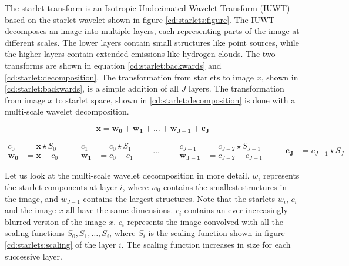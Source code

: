 The starlet transform is an Isotropic Undecimated Wavelet Transform (IUWT) based on the starlet wavelet shown in figure \ref{cd:starlets:figure}. The IUWT decomposes an image into multiple layers, each representing parts of the image at different scales. The lower layers contain small structures like point sources, while the higher layers contain extended emissions like hydrogen clouds. The two transforms are shown in equation \eqref{cd:starlet:backwards} and \eqref{cd:starlet:decomposition}. The transformation from starlets to image $x$, shown in \eqref{cd:starlet:backwards}, is a simple addition of all $J$ layers. The transformation from image $x$ to starlet space, shown in \eqref{cd:starlet:decomposition} is done with a multi-scale wavelet decomposition.

\begin{equation} \label{cd:starlet:backwards}
\bm{x} = \bm{w_0} + \bm{w_1} + \ldots + \bm{w_{J-1}} + \bm{c_J}
\end{equation}

\begin{equation}\label{cd:starlet:decomposition}
	\begin{split}
		c_0 &= \bm{x} \star S_0 \\
		\bm{w_0} &= \bm{x} - c_0
	\end{split}
	\qquad
	\begin{split}
		c_1 &= c_0 \star S_1 \\
		\bm{w_1} &= c_0 - c_1
	\end{split}
	\qquad \ldots \qquad
	\begin{split}
		c_{J-1} &= c_{J-2} \star S_{J-1} \\
		\bm{w_{J-1}} &= c_{J-2} - c_{J-1}
	\end{split}
	\qquad
	\begin{split}
		\bm{c_J} &= c_{J-1} \star S_J
	\end{split}
\end{equation}

Let us look at the multi-scale wavelet decomposition in more detail. $w_i$ represents the starlet components at layer $i$, where $w_0$ contains the smallest structures in the image, and $w_{J-1}$ contains the largest structures. Note that the starlets $w_i$, $c_i$ and the image $x$ all have the same dimensions. $c_i$ contains an ever increasingly blurred version of the image $x$. $c_i$ represents the image convolved with all the scaling functions $S_0, S_1, \ldots, S_i$, where $S_i$ is the scaling function shown in figure \ref{cd:starlets:scaling} of the layer $i$. The scaling function increases in size for each successive layer. 

